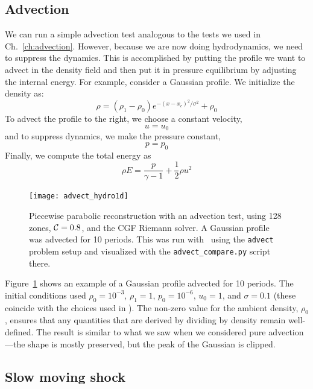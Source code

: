 \subsection{Advection}

We can run a simple advection test analogous to the tests we used in
Ch.~\ref{ch:advection}.  However, because we are now doing hydrodynamics,
we need to suppress the dynamics.  This is accomplished by putting the 
profile we want to advect in the density field and then put it in
pressure equilibrium by adjusting the internal energy.  For example, consider
a Gaussian profile.  We initialize the density as:
\begin{equation}
\rho = (\rho_1 - \rho_0) e^{-(x - x_c)^2/\sigma^2} + \rho_0
\end{equation}
To advect the profile to the right, we choose a constant velocity,
\begin{equation}
u = u_0
\end{equation}
and to suppress dynamics, we make the pressure constant,
\begin{equation}
p = p_0
\end{equation}
Finally, we compute the total energy as
\begin{equation}
\rho E = \frac{p}{\gamma - 1} + \frac{1}{2}\rho u^2
\end{equation}

\begin{figure}[t]
\centering
\texttt{[image: advect\_hydro1d]}
\caption[Simple advection test]{\label{fig:Euler:advect:1d} Piecewise
  parabolic reconstruction with an advection test, using 128 zones,
  ${\mathcal{C}} = 0.8$, and the CGF Riemann solver.  A Gaussian profile was
  advected for 10 periods.  This was run with \hydrooned\ using the
  {\tt advect} problem setup and
  visualized with the {\tt advect\_compare.py} script there.}
\end{figure}

Figure~\ref{fig:Euler:advect:1d} shows an example of a Gaussian
profile advected for 10 periods.  The initial conditions used $\rho_0
= 10^{-3}$, $\rho_1 = 1$, $p_0 = 10^{-6}$, $u_0 = 1$, and $\sigma =
0.1$ (these coincide with the choices used in \cite{flash}).  The
non-zero value for the ambient density, $\rho_0$, ensures that any
quantities that are derived by dividing by density remain
well-defined.  The result is similar to what we saw when we considered
pure advection---the shape is mostly preserved, but the peak of the
Gaussian is clipped.

\subsection{Slow moving shock}

